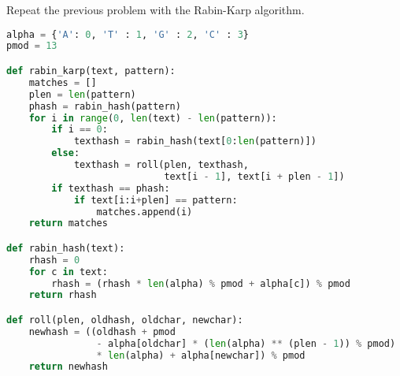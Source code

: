 \documentclass[12pt]{article}
\newenvironment{problem}[2][Problem]{\begin{trivlist}
\item[\hskip \labelsep {\bfseries #1}\hskip \labelsep {\bfseries #2.}]}{\end{trivlist}}
\begin{document}
\begin{problem}{2} %
    Repeat the previous problem with the Rabin-Karp algorithm.
\begin{lstlisting}[language=Python, caption=Rabin-Karp algorithm]
alpha = {'A': 0, 'T' : 1, 'G' : 2, 'C' : 3}
pmod = 13

def rabin_karp(text, pattern):
    matches = []
    plen = len(pattern)
    phash = rabin_hash(pattern)
    for i in range(0, len(text) - len(pattern)):
        if i == 0:
            texthash = rabin_hash(text[0:len(pattern)])
        else:
            texthash = roll(plen, texthash, 
                            text[i - 1], text[i + plen - 1])
        if texthash == phash:
            if text[i:i+plen] == pattern:
                matches.append(i)
    return matches

def rabin_hash(text):
    rhash = 0
    for c in text:
        rhash = (rhash * len(alpha) % pmod + alpha[c]) % pmod
    return rhash

def roll(plen, oldhash, oldchar, newchar):
    newhash = ((oldhash + pmod 
                - alpha[oldchar] * (len(alpha) ** (plen - 1)) % pmod) 
                * len(alpha) + alpha[newchar]) % pmod
    return newhash
\end{lstlisting}


\end{problem}
\end{document}
